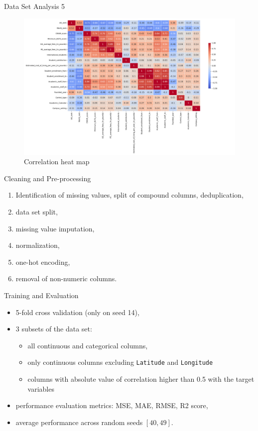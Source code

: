 \documentclass[xcolor=table]{beamer} %
\begin{document}
\begin{frame}{Data Set Analysis 5}
  \vspace{-1.21cm}
  \begin{figure}
    \centering
    \includegraphics[width=0.91 \textwidth]{figs/correlation_heatmap.png}
    \caption{Correlation heat map}
    \label{fig:corr_heatmap}
\end{figure}
\end{frame}

\begin{frame}{Cleaning and Pre-processing}
  \vspace{-1cm}
  \begin{enumerate}
      \item Identification of missing values, split of compound columns, deduplication,
      \item data set split,
      \item missing value imputation,
      \item normalization,
      \item one-hot encoding,
      \item removal of non-numeric columns.
  \end{enumerate}
\end{frame}

\begin{frame}{Training and Evaluation}
  \vspace{-1cm}
  \begin{itemize}
      \item 5-fold cross validation (only on seed 14),
      \item 3 subsets of the data set:
        \begin{itemize}
            \item all continuous and categorical columns,
            \item only continuous columns excluding \texttt{Latitude} and \texttt{Longitude}
            \item columns with absolute value of correlation higher than 0.5 with the target variables
        \end{itemize}
      \item performance evaluation metrics: MSE, MAE, RMSE, R2 score,
      \item average performance across random seeds $[40, 49]$.
  \end{itemize}
\end{frame}
\end{document}
